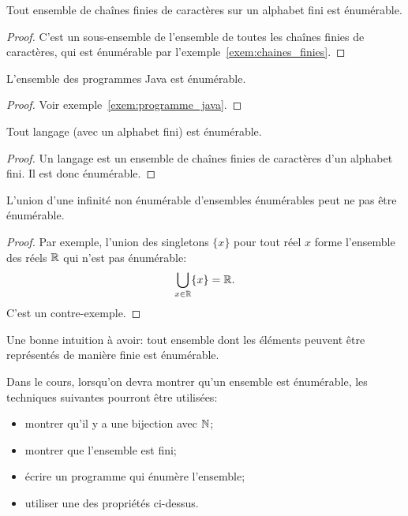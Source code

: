 \begin{myprop}
 Tout ensemble de chaînes finies de caractères sur un alphabet fini est énumérable.
 \begin{proof}
C'est un sous-ensemble de l'ensemble de toutes les chaînes finies de caractères, qui est énumérable par l'exemple~\ref{exem:chaines_finies}.
 \end{proof}
\end{myprop}

\begin{myprop} \label{prop:programme_enumerable}
 L'ensemble des programmes Java est énumérable.
 \begin{proof}
  Voir exemple~\ref{exem:programme_java}.
 \end{proof}
\end{myprop}


\begin{myprop}
 Tout langage (avec un alphabet fini) est énumérable.
 \begin{proof}
 Un langage est un ensemble de chaînes finies de caractères d'un alphabet fini. Il est donc énumérable.
 \end{proof}
\end{myprop}

\begin{myprop}
L'union d'une infinité non énumérable d'ensembles énumérables peut ne pas être énumérable.
\end{myprop}
\begin{proof}
Par exemple, l'union des singletons $\{x\}$ pour tout réel $x$ forme l'ensemble des réels $\mathbb{R}$ qui n'est pas énumérable:
\[ \bigcup_{x \in \mathbb{R}} \{x\} = \mathbb{R}. \]
C'est un contre-exemple.
\end{proof}

\begin{myrem}
  Une bonne intuition à avoir:
  tout ensemble dont les éléments peuvent être représentés de manière finie est énumérable.
\end{myrem}

Dans le cours, lorsqu'on devra montrer qu'un ensemble est énumérable,
les techniques suivantes pourront être utilisées:
\begin{itemize}
	\item montrer qu'il y a une bijection avec $\mathbb{N}$;
	\item montrer que l'ensemble est fini;
	\item écrire un programme qui énumère l'ensemble;
	\item utiliser une des propriétés ci-dessus.
\end{itemize}

